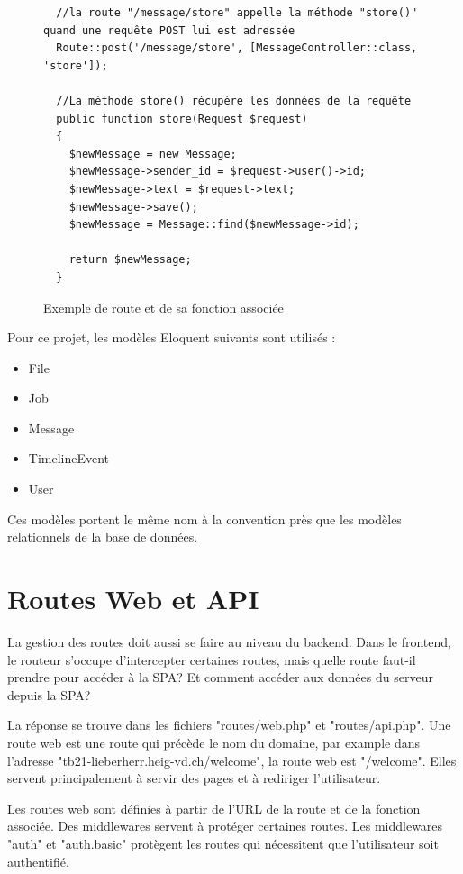 \documentclass[
    iai, %
    eai, %
]{heig-tb}
\begin{document}
\begin{figure}[h]
  \begin{verbatim}
  //la route "/message/store" appelle la méthode "store()" quand une requête POST lui est adressée
  Route::post('/message/store', [MessageController::class, 'store']);

  //La méthode store() récupère les données de la requête
  public function store(Request $request)
  {
    $newMessage = new Message;
    $newMessage->sender_id = $request->user()->id;
    $newMessage->text = $request->text;
    $newMessage->save();
    $newMessage = Message::find($newMessage->id);

    return $newMessage;
  }
  \end{verbatim}
  \caption{Exemple de route et de sa fonction associée}
\end{figure}

Pour ce projet, les modèles Eloquent suivants sont utilisés :
\begin{itemize}
  \item File
  \item Job
  \item Message
  \item TimelineEvent
  \item User
\end{itemize}
\bigskip

Ces modèles portent le même nom à la convention près que les modèles relationnels de la base de données.

\newpage
\section{Routes Web et API}
\label{section:API}
La gestion des routes doit aussi se faire au niveau du backend. Dans le frontend, le routeur s'occupe d'intercepter certaines routes, mais quelle route faut-il prendre pour accéder à la SPA?
Et comment accéder aux données du serveur depuis la SPA?

La réponse se trouve dans les fichiers "routes/web.php" et "routes/api.php". Une route web est une route qui précède le nom du domaine, par example dans l'adresse "tb21-lieberherr.heig-vd.ch/welcome", la route web est "/welcome". Elles servent principalement à servir des pages et à rediriger l'utilisateur.

Les routes web sont définies à partir de l'URL de la route et de la fonction associée. Des middlewares servent à protéger certaines routes. Les middlewares "auth" et "auth.basic" protègent les routes qui nécessitent que l'utilisateur soit authentifié.
\end{document}
